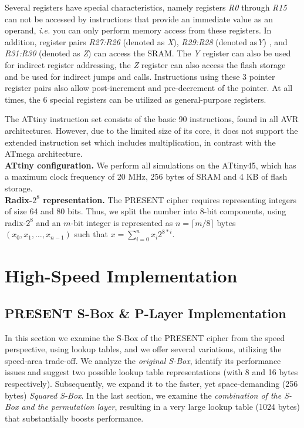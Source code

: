 \documentclass[11pt]{llncs2e} %
\begin{document}
Several registers have special characteristics, namely registers \textit{R0} through \textit{R15} can not be accessed by instructions that provide an immediate value as an operand, \emph{i.e.} you can only perform memory access from these registers.
In addition, register pairs \textit{R27:R26} (denoted as \emph{X}), \textit{R29:R28} (denoted as\emph{Y}) , and \textit{R31:R30} (denoted as \emph{Z}) can access the SRAM.
The \emph{Y} register can also be used for indirect register addressing, the \emph{Z} register can also access the flash storage and be used for indirect jumps and calls.
Instructions using these 3 pointer register pairs also allow post-increment and pre-decrement of the pointer.
At all times, the 6 special registers can be utilized as general-purpose registers.

The ATtiny instruction set consists of the basic 90 instructions, found in all AVR architectures. However, due to the limited size of its core, it does not support the extended instruction set which includes multiplication, in contrast with the ATmega architecture.\\
\textbf{ATtiny configuration.} We perform all simulations on the ATtiny45, which has a maximum clock frequency of 20 MHz, 256 bytes of SRAM and 4 KB of flash storage.\\
\textbf{Radix-$2^8$ representation.} The PRESENT cipher requires representing integers of size 64 and 80 bits. Thus, we split the number into 8-bit components, using radix-$2^8$ and an $m$-bit integer is represented as $n=\lceil{m/8}\rceil$ bytes $(x_0,x_1,\dots,x_{n-1})$ such that $x=\sum_{i=0}^n{x_i 2^{8*i}}$.

\section{High-Speed Implementation}

\subsection{PRESENT S-Box \& P-Layer Implementation}\label{sbox}
In this section we examine the S-Box of the PRESENT cipher from the speed perspective, using lookup tables, and we offer several variations, utilizing the speed-area trade-off. We analyze the \emph{original S-Box}, identify its performance issues and suggest two possible lookup table representations (with 8 and 16 bytes respectively). Subsequently, we expand it to the faster, yet space-demanding (256 bytes) \emph{Squared S-Box}. In the last section, we examine the \emph{combination of the S-Box and the permutation layer}, resulting in a very large lookup table (1024 bytes) that substantially boosts performance.
\end{document}
